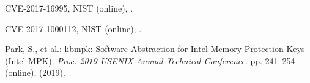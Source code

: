 \documentclass[english,sigrecommended,JIP]{ipsj}
\begin{document}
\begin{thebibliography}{99}
  CVE-2017-16995, NIST (online),   .

  CVE-2017-1000112, NIST (online),  .
    
  
  





    Park, S., et al.: libmpk: Software Abstraction for Intel Memory Protection Keys (Intel MPK).
    \textit{Proc. 2019 USENIX Annual Technical Conference}. pp. 241--254 (online), (2019).    
    


\end{thebibliography}
\end{document}
